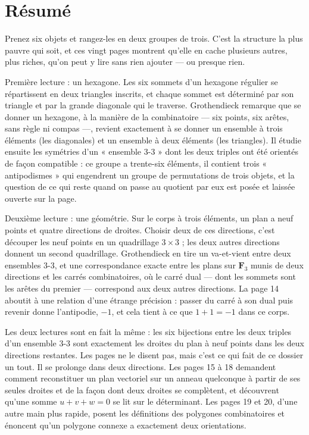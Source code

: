 \documentclass[11pt,a4paper]{article}
\begin{document}
\section*{Résumé}

\begin{resume}
Prenez six objets et rangez-les en deux groupes de trois. C'est la structure
la plus pauvre qui soit, et ces vingt pages montrent qu'elle en cache
plusieurs autres, plus riches, qu'on peut y lire sans rien ajouter — ou
presque rien.

Première lecture : un hexagone. Les six sommets d'un hexagone régulier se
répartissent en deux triangles inscrits, et chaque sommet est déterminé par
son triangle et par la grande diagonale qui le traverse. Grothendieck
remarque que se donner un hexagone, à la manière de la combinatoire — six
points, six arêtes, sans règle ni compas —, revient exactement à se donner un
ensemble à trois éléments (les diagonales) et un ensemble à deux éléments (les
triangles). Il étudie ensuite les symétries d'un « ensemble 3-3 » dont les deux
triples ont été orientés de façon compatible : ce groupe a trente-six
éléments, il contient trois « antipodismes » qui engendrent un groupe de
permutations de trois objets, et la question de ce qui reste quand on passe au quotient par eux est posée et laissée ouverte sur la page.

Deuxième lecture : une géométrie. Sur le corps à trois éléments, un plan a
neuf points et quatre directions de droites. Choisir deux de ces directions,
c'est découper les neuf points en un quadrillage $3 \times 3$ ; les deux autres
directions donnent un second quadrillage. Grothendieck en tire un va-et-vient
entre deux ensembles 3-3, et une correspondance exacte entre les plans sur
$\mathbf{F}_3$ munis de deux directions et les carrés combinatoires, où le carré
dual — dont les sommets sont les arêtes du premier — correspond aux deux
autres directions. La page 14 aboutit à une relation d'une étrange précision :
passer du carré à son dual puis revenir donne l'antipodie, $-1$, et cela tient
à ce que $1 + 1 = -1$ dans ce corps.

Les deux lectures sont en fait la même : les six bijections entre les deux
triples d'un ensemble 3-3 sont exactement les droites du plan à neuf points
dans les deux directions restantes. Les pages ne le disent pas, mais c'est ce
qui fait de ce dossier un tout. Il se prolonge dans deux directions. Les pages
15 à 18 demandent comment reconstituer un plan vectoriel sur un anneau
quelconque à partir de ses seules droites et de la façon dont deux droites se
complètent, et découvrent qu'une somme $u + v + w = 0$ se lit sur le
déterminant. Les pages 19 et 20, d'une autre main plus rapide, posent les
définitions des polygones combinatoires et énoncent qu'un polygone connexe a
exactement deux orientations.


\end{resume}
\end{document}
